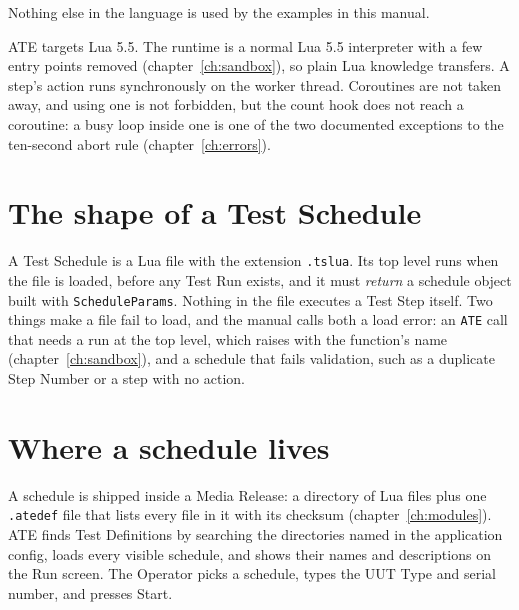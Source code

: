 Nothing else in the language is used by the examples in this manual.

ATE targets Lua 5.5. The runtime is a normal Lua 5.5 interpreter with a few entry points
removed (chapter~\ref{ch:sandbox}), so plain Lua knowledge transfers. A step's action runs
synchronously on the worker thread. Coroutines are not taken away, and using one is not
forbidden, but the count hook does not reach a coroutine: a busy loop inside one is one of the
two documented exceptions to the ten-second abort rule (chapter~\ref{ch:errors}).

\section{The shape of a Test Schedule}

A Test Schedule is a Lua file with the extension \texttt{.tslua}. Its top level runs when the
file is loaded, before any Test Run exists, and it must \emph{return} a schedule object built
with \texttt{ScheduleParams}. Nothing in the file executes a Test Step itself. Two things make a
file fail to load, and the manual calls both a load error: an \texttt{ATE} call that needs a run
at the top level, which raises with the function's name (chapter~\ref{ch:sandbox}), and a
schedule that fails validation, such as a duplicate Step Number or a step with no action.

\section{Where a schedule lives}

A schedule is shipped inside a Media Release: a directory of Lua files plus one
\texttt{.atedef} file that lists every file in it with its checksum (chapter~\ref{ch:modules}).
ATE finds Test Definitions by searching the directories named in the application config,
loads every visible schedule, and shows their names and descriptions on the Run screen.
The Operator picks a schedule, types the UUT Type and serial number, and presses Start.

